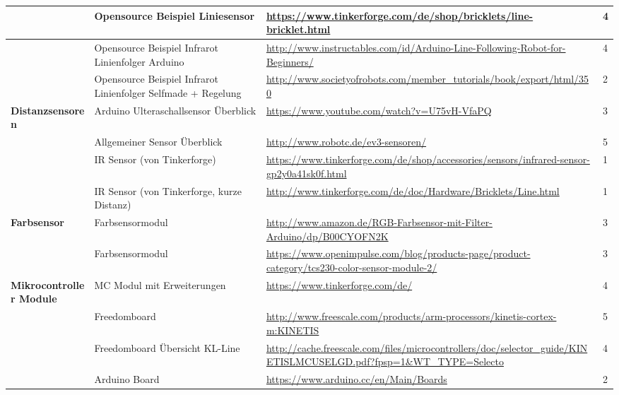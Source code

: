 \begin{tabular}{|p{3cm}|p{3.5cm}|p{5cm}|p{2cm}|}\hline
				 			&	Opensource Beispiel Liniesensor	&	\url{https://www.tinkerforge.com/de/shop/bricklets/line-bricklet.html}	&	4 \\\hline
 				 			&	Opensource Beispiel Infrarot Linienfolger Arduino	&	\url{http://www.instructables.com/id/Arduino-Line-Following-Robot-for-Beginners/}	&	4 \\\hline
 				 			&	Opensource Beispiel Infrarot Linienfolger Selfmade + Regelung	&	\url{http://www.societyofrobots.com/member_tutorials/book/export/html/350}	&	2 \\\hline
 \textbf{Distanzsensoren}	&	Arduino Ulteraschallsensor Überblick &	\url{https://www.youtube.com/watch?v=U75vH-VfaPQ}	&	3 \\\hline	
 							&	Allgemeiner Sensor Überblick &	\url{http://www.robotc.de/ev3-sensoren/}	&	5 \\\hline	
 							&	IR Sensor (von Tinkerforge) &	\url{https://www.tinkerforge.com/de/shop/accessories/sensors/infrared-sensor-gp2y0a41sk0f.html}	&	1 \\\hline	
 							&	IR Sensor (von Tinkerforge, kurze Distanz) &	\url{http://www.tinkerforge.com/de/doc/Hardware/Bricklets/Line.html}	&	1 \\\hline	
 							
 							


\textbf{Farbsensor}	&	Farbsensormodul	&	\url{http://www.amazon.de/RGB-Farbsensor-mit-Filter-Arduino/dp/B00CYOFN2K}	&	3 \\\hline	
					&	Farbsensormodul	&	\url{https://www.openimpulse.com/blog/products-page/product-category/tcs230-color-sensor-module-2/}	&	3 \\\hline
		 		
\textbf{Mikrocontroller Module}	&	MC Modul mit Erweiterungen	&	\url{https://www.tinkerforge.com/de/}	&	4 \\\hline
					&	Freedomboard	&	\url{http://www.freescale.com/products/arm-processors/kinetis-cortex-m:KINETIS}	&	5 \\\hline
					&	Freedomboard Übersicht KL-Line	&	\url{http://cache.freescale.com/files/microcontrollers/doc/selector_guide/KINETISLMCUSELGD.pdf?fpsp=1&WT_TYPE=Selecto}	&	4 \\\hline
					
					
					&	Arduino Board &	\url{https://www.arduino.cc/en/Main/Boards}	&	2 \\\hline					
					

\end{tabular}
